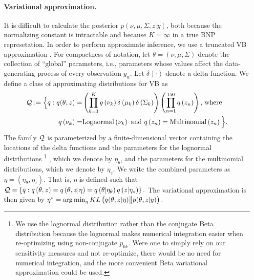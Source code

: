 %
\paragraph{Variational approximation.}
It is difficult to calculate the posterior $p\left(\nu, \mu, \Sigma, z \vert
y\right)$, both because the normalizing constant is intractable and because
$K=\infty$ in a true BNP represetation. In order to perform approximate
inference, we use a truncated VB approximation
\citep{blei:2006:dirichletbnp}. For compactness of notation, let $\theta =
\left(\nu, \mu, \Sigma\right)$ denote the collection of ``global'' parameters,
i.e., parameters whose values affect the data-generating process of every
observation $y_n$.   Let $\delta\left(\cdot\right)$ denote a delta function. We
define a class of approximating distributions for VB as
%
\begin{align*}
\mathcal{Q} := \Big\{ q:
q(\theta, z) = &
\left(\prod_{k=1}^{K}q\left(\nu_{k}\right)\delta\left(\mu_{k}\right)
    \delta\left(\Sigma_{k}\right)\right)
    \left(\prod_{n=1}^{150}q\left(z_{n}\right) \right)\textrm{, where } \\
q\left(\nu_{k}\right) =& \mathrm{Lognormal}\left(\nu_k\right) \textrm{ and }
q\left(z_n\right) = \mathrm{Multinomial}\left(z_n\right)
\Big\}.
\end{align*}
%
The family $\mathcal{Q}$ is parameterized by a finite-dimensional vector containing
the locations of the delta functions and the parameters for the lognormal
distributions
%
\footnote{We use the lognormal distribution rather than the conjugate Beta
distribution because the lognormal makes numerical integration easier when
re-optimizing using non-conjugate $p_{0k}$.  Were one to simply rely on our
sensitivity measures and not re-optimize, there would be no need for numerical
integration, and the more convenient Beta variational approximation could be
used.}
%
, which we denote by $\eta_\theta$, and the parameters for the
multinomial distributions, which we denote by $\eta_z$. We write the combined
parameters as $\eta=\left(\eta_\theta, \eta_z\right)$. That is, $\eta$ is
defined such that
%
$\mathcal{Q} =
    \left\{q: q\left(\theta, z\right) =
            q\left(\theta, z \vert \eta \right) =
            q\left(\theta \vert \eta_\theta \right)
            q\left(z \vert \eta_z \right)
    \right\}.$
%
The variational approximation is then given by
%
$
\etaopt = \argmin_{\eta} KL\left(
    q(\theta, z \vert \eta) \big\| p(\theta, z | y)
    \right). %
$
%

